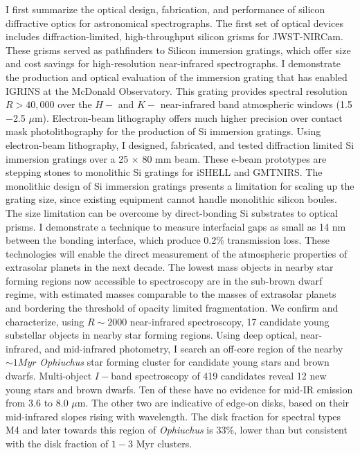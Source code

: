 \documentclass[12pt]{report}	%
\begin{document}
%
\utabstract
{}%
\indent

I first summarize the optical design, fabrication, and performance of silicon diffractive optics for astronomical spectrographs.  The first set of optical devices includes diffraction-limited, high-throughput silicon grisms for JWST-NIRCam.  These grisms served as pathfinders to Silicon immersion gratings, which offer size and cost savings for high-resolution near-infrared spectrographs.  I demonstrate the production and optical evaluation of the immersion grating that has enabled IGRINS at the McDonald Observatory.  This grating provides spectral resolution $R>40,000$ over the $H-$ and $K-$ near-infrared band atmospheric windows (1.5$-$2.5 $\mu$m).  Electron-beam lithography offers much higher precision over contact mask photolithography for the production of Si immersion gratings.  Using electron-beam lithography, I designed, fabricated, and tested diffraction limited Si immersion gratings over a 25 $\times$ 80 mm beam.  These e-beam prototypes are stepping stones to monolithic Si gratings for iSHELL and GMTNIRS.  The monolithic design of Si immersion gratings presents a limitation for scaling up the grating size, since existing equipment cannot handle monolithic silicon boules.  The size limitation can be overcome by direct-bonding Si substrates to optical prisms.  I demonstrate a technique to measure interfacial gaps as small as 14 nm between the bonding interface, which produce 0.2\% transmission loss.  These technologies will enable the direct measurement of the atmospheric properties of extrasolar planets in the next decade.  The lowest mass objects in nearby star forming regions now accessible to spectroscopy are in the sub-brown dwarf regime, with estimated masses comparable to the masses of extrasolar planets and bordering the threshold of opacity limited fragmentation.  We confirm and characterize, using $R\sim 2000$ near-infrared spectroscopy, 17 candidate young substellar objects in nearby star forming regions.  Using deep optical, near-infrared, and mid-infrared photometry, I search an off-core region of the nearby $\sim1 Myr$ \emph{Ophiuchus} star forming cluster for candidate young stars and brown dwarfs.  Multi-object $I-$band spectroscopy of 419 candidates reveal 12 new young stars and brown dwarfs.  Ten of these have no evidence for mid-IR emission from 3.6 to 8.0 $\mu$m.  The other two are indicative of edge-on disks, based on their mid-infrared slopes rising with wavelength.  The disk fraction for spectral types M4 and later towards this region of \emph{Ophiuchus} is 33\%, lower than but consistent with the disk fraction of $1-3$ Myr clusters.
\end{document}
